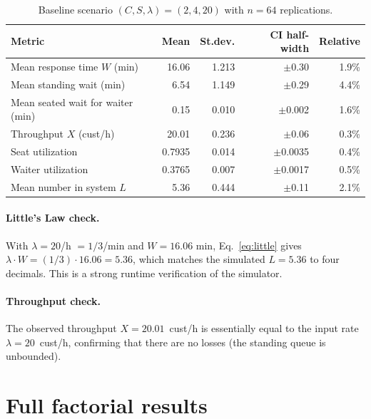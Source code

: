 \documentclass[11pt,a4paper]{article}
\begin{document}
\begin{table}[h]
\centering
\caption{Baseline scenario $(C,S,\lambda) = (2,4,20)$ with $n=64$ replications.}
\label{tab:baseline}
\begin{tabular}{l r r r r}
\toprule
Metric & Mean & St.dev. & CI half-width & Relative \\
\midrule
Mean response time $W$ (min)          & 16.06 & 1.213 & $\pm$0.30 & 1.9\% \\
Mean standing wait (min)              &  6.54 & 1.149 & $\pm$0.29 & 4.4\% \\
Mean seated wait for waiter (min)     &  0.15 & 0.010 & $\pm$0.002 & 1.6\% \\
Throughput $X$ (cust/h)               & 20.01 & 0.236 & $\pm$0.06 & 0.3\% \\
Seat utilization                      & 0.7935& 0.014 & $\pm$0.0035 & 0.4\% \\
Waiter utilization                    & 0.3765& 0.007 & $\pm$0.0017 & 0.5\% \\
Mean number in system $L$             &  5.36 & 0.444 & $\pm$0.11 & 2.1\% \\
\bottomrule
\end{tabular}
\end{table}

\paragraph{Little's Law check.}
With $\lambda = 20$/h $= 1/3$/min and $W = 16.06$ min,
Eq.~\eqref{eq:little} gives $\lambda \cdot W = (1/3)\cdot 16.06 = 5.36$,
which matches the simulated $L = 5.36$ to four decimals. This is a
strong runtime verification of the simulator.

\paragraph{Throughput check.}
The observed throughput $X = 20.01$~cust/h is essentially equal to
the input rate $\lambda = 20$~cust/h, confirming that there are no
losses (the standing queue is unbounded).

\section{Full factorial results}
\label{sec:results-factorial}
\end{document}

